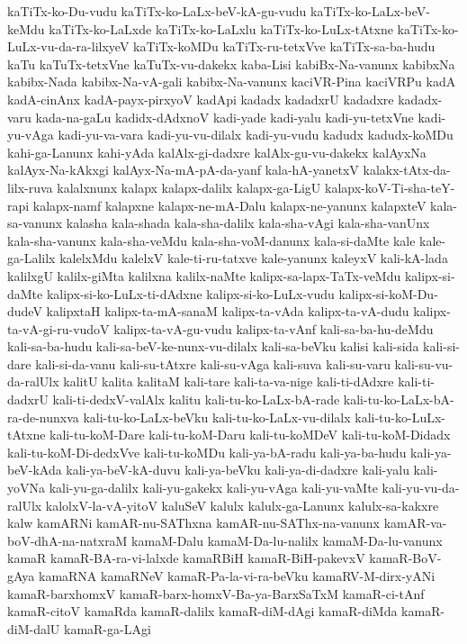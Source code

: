 {kaTiTx-ko-Du-vudu
kaTiTx-ko-LaLx-beV-kA-gu-vudu
kaTiTx-ko-LaLx-beV-keMdu
kaTiTx-ko-LaLxde
kaTiTx-ko-LaLxlu
kaTiTx-ko-LuLx-tAtxne
kaTiTx-ko-LuLx-vu-da-ra-lilxyeV
kaTiTx-koMDu
kaTiTx-ru-tetxVve
kaTiTx-sa-ba-hudu
kaTu
kaTuTx-tetxVne
kaTuTx-vu-dakekx
kaba-Lisi
kabiBx-Na-vanunx
kabibxNa
kabibx-Nada
kabibx-Na-vA-gali
kabibx-Na-vanunx
kaciVR-Pina
kaciVRPu
kadA
kadA-cinAnx
kadA-payx-pirxyoV
kadApi
kadadx
kadadxrU
kadadxre
kadadx-varu
kada-na-gaLu
kadidx-dAdxnoV
kadi-yade
kadi-yalu
kadi-yu-tetxVne
kadi-yu-vAga
kadi-yu-va-vara
kadi-yu-vu-dilalx
kadi-yu-vudu
kadudx
kadudx-koMDu
kahi-ga-Lanunx
kahi-yAda
kalAlx-gi-dadxre
kalAlx-gu-vu-dakekx
kalAyxNa
kalAyx-Na-kAkxgi
kalAyx-Na-mA-pA-da-yanf
kala-hA-yanetxV
kalakx-tAtx-da-lilx-ruva
kalalxnunx
kalapx
kalapx-dalilx
kalapx-ga-LigU
kalapx-koV-Ti-sha-teY-rapi
kalapx-namf
kalapxne
kalapx-ne-mA-Dalu
kalapx-ne-yanunx
kalapxteV
kala-sa-vanunx
kalasha
kala-shada
kala-sha-dalilx
kala-sha-vAgi
kala-sha-vanUnx
kala-sha-vanunx
kala-sha-veMdu
kala-sha-voM-danunx
kala-si-daMte
kale
kale-ga-Lalilx
kalelxMdu
kalelxV
kale-ti-ru-tatxve
kale-yanunx
kaleyxV
kali-kA-lada
kalilxgU
kalilx-giMta
kalilxna
kalilx-naMte
kalipx-sa-lapx-TaTx-veMdu
kalipx-si-daMte
kalipx-si-ko-LuLx-ti-dAdxne
kalipx-si-ko-LuLx-vudu
kalipx-si-koM-Du-dudeV
kalipxtaH
kalipx-ta-mA-sanaM
kalipx-ta-vAda
kalipx-ta-vA-dudu
kalipx-ta-vA-gi-ru-vudoV
kalipx-ta-vA-gu-vudu
kalipx-ta-vAnf
kali-sa-ba-hu-deMdu
kali-sa-ba-hudu
kali-sa-beV-ke-nunx-vu-dilalx
kali-sa-beVku
kalisi
kali-sida
kali-si-dare
kali-si-da-vanu
kali-su-tAtxre
kali-su-vAga
kali-suva
kali-su-varu
kali-su-vu-da-ralUlx
kalitU
kalita
kalitaM
kali-tare
kali-ta-va-nige
kali-ti-dAdxre
kali-ti-dadxrU
kali-ti-dedxV-valAlx
kalitu
kali-tu-ko-LaLx-bA-rade
kali-tu-ko-LaLx-bA-ra-de-nunxva
kali-tu-ko-LaLx-beVku
kali-tu-ko-LaLx-vu-dilalx
kali-tu-ko-LuLx-tAtxne
kali-tu-koM-Dare
kali-tu-koM-Daru
kali-tu-koMDeV
kali-tu-koM-Didadx
kali-tu-koM-Di-dedxVve
kali-tu-koMDu
kali-ya-bA-radu
kali-ya-ba-hudu
kali-ya-beV-kAda
kali-ya-beV-kA-duvu
kali-ya-beVku
kali-ya-di-dadxre
kali-yalu
kali-yoVNa
kali-yu-ga-dalilx
kali-yu-gakekx
kali-yu-vAga
kali-yu-vaMte
kali-yu-vu-da-ralUlx
kalolxV-la-vA-yitoV
kaluSeV
kalulx
kalulx-ga-Lanunx
kalulx-sa-kakxre
kalw
kamARNi
kamAR-nu-SAThxna
kamAR-nu-SAThx-na-vanunx
kamAR-va-boV-dhA-na-natxraM
kamaM-Dalu
kamaM-Da-lu-nalilx
kamaM-Da-lu-vanunx
kamaR
kamaR-BA-ra-vi-lalxde
kamaRBiH
kamaR-BiH-pakevxV
kamaR-BoV-gAya
kamaRNA
kamaRNeV
kamaR-Pa-la-vi-ra-beVku
kamaRV-M-dirx-yANi
kamaR-barxhomxV
kamaR-barx-homxV-Ba-ya-BarxSaTxM
kamaR-ci-tAnf
kamaR-citoV
kamaRda
kamaR-dalilx
kamaR-diM-dAgi
kamaR-diMda
kamaR-diM-dalU
kamaR-ga-LAgi
}
